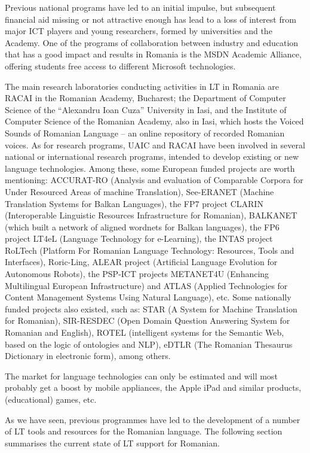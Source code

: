 \begin{multicols}{2}
Previous national programs have led to an initial impulse, but subsequent financial aid missing or not attractive enough has lead to a loss of interest from major ICT players and young researchers, formed by universities and the Academy. One of the programs of collaboration between industry and education that has a good impact and results in Romania is the MSDN Academic Alliance, offering students free access to different Microsoft technologies. 

The main research laboratories conducting activities in LT in Romania are RACAI in the Romanian Academy, Bucharest; the Department of Computer Science of the “Alexandru Ioan Cuza” University in Iasi, and the Institute of Computer Science of the Romanian Academy, also in Iasi, which hosts the Voiced Sounds of Romanian Language -- an online repository of recorded Romanian voices. As for research programs, UAIC and RACAI have been involved in several national or international research programs, intended to develop existing or new language technologies. Among these, some European funded projects are worth mentioning: ACCURAT-RO (Analysis and evaluation of Comparable Corpora for Under Resourced Areas of machine Translation), See-ERANET (Machine Translation Systems for Balkan Languages), the FP7 project CLARIN (Interoperable Linguistic Resources Infrastructure for Romanian), BALKANET (which built a network of aligned wordnets for Balkan languages), the FP6 project LT4eL (Language Technology for e-Learning), the INTAS project RoLTech (Platform For Romanian Language Technology: Resources, Tools and Interfaces), Roric-Ling, ALEAR project (Artificial Language Evolution for Autonomous Robots), the PSP-ICT projects METANET4U (Enhancing Multilingual European Infrastructure) and ATLAS (Applied Technologies for Content Management Systems Using Natural Language), etc. Some nationally funded projects also existed, such as: STAR (A System for Machine Translation for Romanian), SIR-RESDEC (Open Domain Question Answering System for Romanian and English), ROTEL (intelligent systems for the Semantic Web, based on the logic of ontologies and NLP), eDTLR (The Romanian Thesaurus Dictionary in electronic form), among others.

The market for language technologies can only be estimated and will most probably get a boost by mobile appliances, the Apple iPad and similar products, (educational) games, etc. 

As we have seen, previous programmes have led to the development of a number of LT tools and resources for the Romanian language. The following section summarises the current state of LT support for Romanian.
  

\end{multicols}
